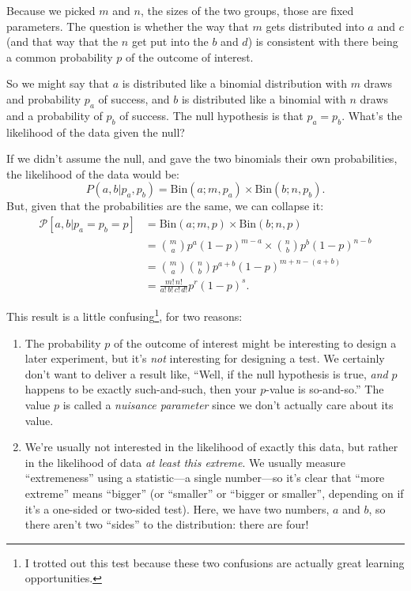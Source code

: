 \documentclass{book}
\providecommand{\tightlist}{%
  \setlength{\itemsep}{0pt}\setlength{\parskip}{0pt}}
\begin{document}
Because we picked \(m\) and \(n\), the sizes of the two groups, those
are fixed parameters. The question is whether the way that \(m\) gets
distributed into \(a\) and \(c\) (and that way that the \(n\) get put
into the \(b\) and \(d\)) is consistent with there being a common
probability \(p\) of the outcome of interest.

So we might say that \(a\) is distributed like a binomial distribution
with \(m\) draws and probability \(p_a\) of success, and \(b\) is
distributed like a binomial with \(n\) draws and a probability of
\(p_b\) of success. The null hypothesis is that \(p_a = p_b\). What's
the likelihood of the data given the null?

If we didn't assume the null, and gave the two binomials their own
probabilities, the likelihood of the data would be: \[
P(a, b | p_a, p_b) = \mathrm{Bin}(a; m, p_a) \times \mathrm{Bin}(b; n, p_b).
\] But, given that the probabilities are the same, we can collapse it:
\[
\begin{aligned}
\mathcal{P}[a, b | p_a = p_b = p] &= \mathrm{Bin}(a; m, p) \times \mathrm{Bin}(b; n, p) \\
  &= \binom{m}{a} p^a (1-p)^{m-a} \times \binom{n}{b} p^b (1-p)^{n-b} \\
  &= \binom{m}{a} \binom{n}{b} p^{a+b} (1-p)^{m+n-(a+b)} \\
  &= \frac{m! \, n!}{a! \, b! \, c! \, d!} p^r (1-p)^s.
\end{aligned}
\]

This result is a little confusing\footnote{I trotted out this test
  because these two confusions are actually great learning
  opportunities.}, for two reasons:

\begin{enumerate}
\def\labelenumi{\arabic{enumi}.}
\tightlist
\item
  The probability \(p\) of the outcome of interest might be interesting
  to design a later experiment, but it's \emph{not} interesting for
  designing a test. We certainly don't want to deliver a result like,
  ``Well, if the null hypothesis is true, \emph{and} \(p\) happens to be
  exactly such-and-such, then your \(p\)-value is so-and-so.'' The value
  \(p\) is called a \emph{nuisance parameter} since we don't actually
  care about its value.
\item
  We're usually not interested in the likelihood of exactly this data,
  but rather in the likelihood of data \emph{at least this extreme}. We
  usually measure ``extremeness'' using a statistic---a single
  number---so it's clear that ``more extreme'' means ``bigger'' (or
  ``smaller'' or ``bigger or smaller'', depending on if it's a one-sided
  or two-sided test). Here, we have two numbers, \(a\) and \(b\), so
  there aren't two ``sides'' to the distribution: there are four!
\end{enumerate}
\end{document}
